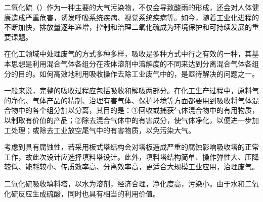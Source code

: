 \begin{foreword}
	
	二氧化硫（）作为一种主要的大气污染物，不仅会导致酸雨的形成，还会对人体健康造成严重危害，诱发呼吸系统疾病、视觉系统疾病等。如今，随着工业化进程的不断加快，排放量逐年递增，控制和治理二氧化硫成为环境保护和可持续发展的重要课题。
	
	在化工领域中处理废气的方式多种多样，吸收是多种方式中行之有效的一种，其基本思想是利用混合气体各组分在液体溶剂中溶解度的不同来达到分离混合气体各组分的目的。如何高效地利用吸收操作去除工业废气中的，是亟待解决的问题之一。
	
	一般来说，完整的吸收过程应包括吸收和解吸两部分。在化工生产过程中，原料气的净化、气体产品的精制、治理有害气体、保护环境等方面都要用到吸收将气体混合物中的各个组分加以分离，其目的是：①回收或捕获气体混合物中的有用物质，以制取有价值的产品；②除去混合气体中的有害成分，使气体净化，以便进一步加工处理；或除去工业放空尾气中的有害物质，以免污染大气。
	
	考虑到具有腐蚀性，若采用板式塔结构会对塔板造成严重的腐蚀影响吸收塔的正常工作，故此次设计应选择填料塔设计。此外，填料塔结构简单、操作弹性大、压降较低、能耗较小、传质效率高、分离效率高，更适合大规模工业应用，治理废气。
	
	二氧化硫吸收填料塔，以水为溶剂，经济合理，净化度高，污染小。由于水和二氧化硫反应生成硫酸，同时也具有相当的利用价值。
	
\end{foreword}